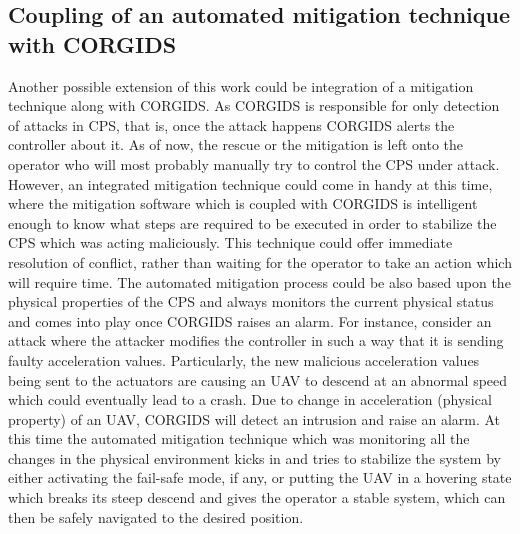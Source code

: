 \subsection{Coupling of an automated mitigation technique with \ac{CORGIDS}}
Another possible extension of this work could be integration of a mitigation technique along with \ac{CORGIDS}. As \ac{CORGIDS} is responsible for only  detection of attacks in \ac{CPS}, that is, once the attack happens \ac{CORGIDS} alerts the controller about it. As of now, the rescue or the mitigation is left onto the operator who will most probably manually try to control the \ac{CPS} under attack. However, an integrated mitigation technique could come in handy at this time, where the mitigation software which is coupled with \ac{CORGIDS} is intelligent enough to know what steps are required to be executed in order to  stabilize the \ac{CPS} which was acting maliciously. This technique could offer immediate resolution of conflict, rather than waiting for the operator to take an action which will require time. The automated mitigation process could be also based upon the physical properties of the \ac{CPS} and always monitors the current physical status and comes into play once \ac{CORGIDS} raises an alarm. For instance, consider an attack where the attacker modifies the controller in such a way that it is sending faulty acceleration values. Particularly, the new malicious acceleration values being sent to the actuators are causing an \ac{UAV} to descend at an abnormal speed which could eventually lead to a crash. Due to change in acceleration (physical property) of an \ac{UAV}, \ac{CORGIDS} will detect an intrusion and raise an alarm. At this time the automated mitigation technique which was monitoring all the changes in the physical environment kicks in and tries to stabilize the system by either activating the fail-safe mode, if any, or putting the \ac{UAV} in a hovering state which breaks its steep descend and gives the operator a stable system, which can then be safely navigated to the desired position.

 \endinput
